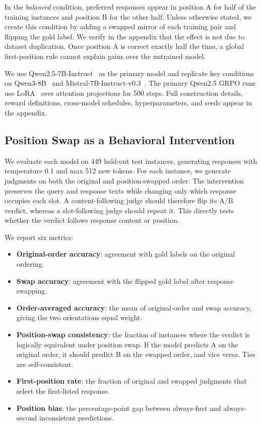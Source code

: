 \documentclass[letterpaper]{article}
\begin{document}
In the \emph{balanced} condition, preferred responses appear in position A for half of the training instances and position B for the other half. Unless otherwise stated, we create this condition by adding a swapped mirror of each training pair and flipping the gold label. We verify in the appendix that the effect is not due to dataset duplication. Once position A is correct exactly half the time, a global first-position rule cannot explain gains over the untrained model.

We use Qwen2.5-7B-Instruct~\citep{qwen2025qwen25} as the primary model and replicate key conditions on Qwen3-8B~\citep{qwen2025qwen3} and Mistral-7B-Instruct-v0.3~\citep{jiang2023mistral}. The primary Qwen2.5 GRPO runs use LoRA~\citep{hu2022lora} over attention projections for 500 steps. Full construction details, reward definitions, cross-model schedules, hyperparameters, and seeds appear in the appendix.

\subsection{Position Swap as a Behavioral Intervention}

We evaluate each model on 449 held-out test instances, generating responses with temperature 0.1 and max 512 new tokens. For each instance, we generate judgments on both the original and position-swapped order. The intervention preserves the query and response texts while changing only which response occupies each slot. A content-following judge should therefore flip its A/B verdict, whereas a slot-following judge should repeat it. This directly tests whether the verdict follows response content or position.

We report six metrics:
\begin{itemize}
\item \textbf{Original-order accuracy}: agreement with gold labels on the original ordering.
\item \textbf{Swap accuracy}: agreement with the flipped gold label after response swapping.
\item \textbf{Order-averaged accuracy}: the mean of original-order and swap accuracy, giving the two orientations equal weight.
\item \textbf{Position-swap consistency}: the fraction of instances where the verdict is logically equivalent under position swap. If the model predicts A on the original order, it should predict B on the swapped order, and vice versa. Ties are self-consistent.
\item \textbf{First-position rate}: the fraction of original and swapped judgments that select the first-listed response.
\item \textbf{Position bias}: the percentage-point gap between always-first and always-second inconsistent predictions.
\end{itemize}
\end{document}
